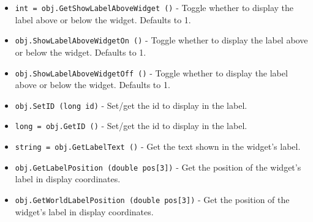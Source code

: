 \begin{itemize}
\item  \verb|int = obj.GetShowLabelAboveWidget ()| -  Toggle whether to display the label above or below the widget.
 Defaults to 1.

\item  \verb|obj.ShowLabelAboveWidgetOn ()| -  Toggle whether to display the label above or below the widget.
 Defaults to 1.

\item  \verb|obj.ShowLabelAboveWidgetOff ()| -  Toggle whether to display the label above or below the widget.
 Defaults to 1.

\item  \verb|obj.SetID (long id)| -  Set/get the id to display in the label.

\item  \verb|long = obj.GetID ()| -  Set/get the id to display in the label.

\item  \verb|string = obj.GetLabelText ()| -  Get the text shown in the widget's label.

\item  \verb|obj.GetLabelPosition (double pos[3])| -  Get the position of the widget's label in display coordinates.

\item  \verb|obj.GetWorldLabelPosition (double pos[3])| -  Get the position of the widget's label in display coordinates.

\end{itemize}
